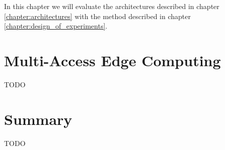 In this chapter we will evaluate the architectures described in chapter \ref{chapter:architectures} with the method described in chapter \ref{chapter:design_of_experiments}.



\section{Multi-Access Edge Computing}
TODO






\section{Summary}
TODO